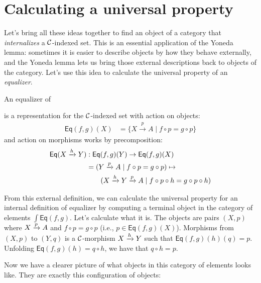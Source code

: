 \section{Calculating a universal property}
Let's bring all these ideas together to find an object of a category that
\emph{internalizes} a $\mathcal C$-indexed set. 
This is an essential application of the Yoneda lemma: sometimes it is 
easier to describe objects by how they behave externally, and the Yoneda 
lemma lets us bring those external descriptions back to objects of the category.
Let's use this idea to calculate the universal property of an \emph{equalizer}.

\begin{definition}[Equalizer]
  \sloppy
  An equalizer of
is a representation for the $\mathcal C$-indexed set with action on 
objects:
\begin{align*}
  \mathsf{Eq}(f,g)(X) &= \{ X \xrightarrow{p} A \mid f \circ p = g \circ p \}
\end{align*}
and action on morphisms works by precomposition:
\begin{align*}
  \mathsf{Eq}(X \xrightarrow{h} Y) &: \mathsf{Eq}(f,g)(Y) \to \mathsf{Eq}(f,g)(X)\\
  &= (Y \xrightarrow{p} A \mid f \circ p = g \circ p) \mapsto  \\
  & \qquad (X \xrightarrow{h} Y \xrightarrow{p} A \mid f \circ p \circ h = g \circ p \circ h) 
\end{align*}
\end{definition}

From this external definition, we can calculate the universal 
property for an internal definition of equalizer by 
computing a terminal object in the category of elements $\int \mathsf{Eq}(f,g)$.
Let's calculate what it is.
The objects are pairs $(X, p)$ where $X \xrightarrow{p} A$ and $f \circ p = g \circ p$ (i.e., $p \in \mathsf{Eq}(f,g)(X)$).
Morphisms from $(X, p)$ to $(Y, q)$ 
is a $\mathcal C$-morphism $X \xrightarrow{h} Y$ such that 
$\mathsf{Eq}(f, g)(h)(q) = p$. Unfolding $\mathsf{Eq}(f, g)(h) = q \circ h$, 
we have that $q \circ h = p$.

Now we have a clearer picture of what objects in this category 
of elements looks like. They are exactly this configuration of objects:

\begin{center}
\end{center}

